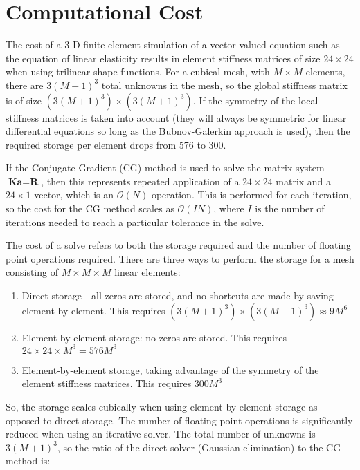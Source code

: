 \documentclass[10pt]{article}
\begin{document}
\section{Computational Cost}

The cost of a 3-D finite element simulation of a vector-valued equation such as the equation of linear elasticity results in element stiffness matrices of size \(24\times24\) when using trilinear shape functions. For a cubical mesh, with \(M\times M\) elements, there are \(3(M+1)^3\) total unknowns in the mesh, so the global stiffness matrix is of size \((3(M+1)^3)\times(3(M+1)^3)\). If the symmetry of the local stiffness matrices is taken into account (they will always be symmetric for linear differential equations so long as the Bubnov-Galerkin approach is used), then the required storage per element drops from 576 to 300. 

If the Conjugate Gradient (CG) method is used to solve the matrix system \(\textbf{K}\textbf{a}=\textbf{R}\), then this represents repeated application of a \(24\times24\) matrix and a \(24\times1\) vector, which is an \(\mathscr{O}(N)\) operation. This is performed for each iteration, so the cost for the CG method scales as \(\mathscr{O}(IN)\), where \(I\) is the number of iterations needed to reach a particular tolerance in the solve.

The cost of a solve refers to both the storage required and the number of floating point operations required. There are three ways to perform the storage for a mesh consisting of \(M\times M\times M\) linear elements:

\begin{enumerate}
\item Direct storage - all zeros are stored, and no shortcuts are made by saving element-by-element. This requires \((3(M+1)^3)\times(3(M+1)^3)\approx9M^6\)
\item Element-by-element storage: no zeros are stored. This requires \(24\times24\times M^3=576M^3\)
\item Element-by-element storage, taking advantage of the symmetry of the element stiffness matrices. This requires \(300M^3\)
\end{enumerate} 

So, the storage scales cubically when using element-by-element storage as opposed to direct storage. The number of floating point operations is significantly reduced when using an iterative solver. The total number of unknowns is \(3(M+1)^3\), so the ratio of the direct solver (Gaussian elimination) to the CG method is:
\end{document}
